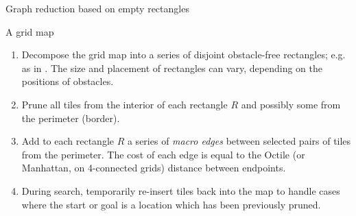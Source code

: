 \begin{algorithm}
\caption{Graph reduction based on empty rectangles}
\label{alg:rsr}
\begin{algorithmic}
\REQUIRE A grid map 
\begin{enumerate}
\item{\label{alg:rsr:1} Decompose the grid map into a series of disjoint
obstacle-free rectangles; e.g. as in \cite{harabor10}. The size and placement of 
rectangles can vary, depending on the positions of obstacles.}
\item{\label{alg:rsr:2} Prune all tiles from the interior of each rectangle $R$
and possibly some from the perimeter (border).}
\item{\label{alg:rsr:3} Add to each rectangle $R$ a series of \emph{macro edges} between 
selected pairs of tiles from the perimeter. The cost of each edge is equal to
the Octile (or Manhattan, on 4-connected grids) distance between endpoints.}
\item{\label{alg:rsr:4} During search, temporarily re-insert tiles back into the map to handle cases where the
start or goal is a location which has been previously pruned.}
\end{enumerate}
\end{algorithmic}
\end{algorithm}

